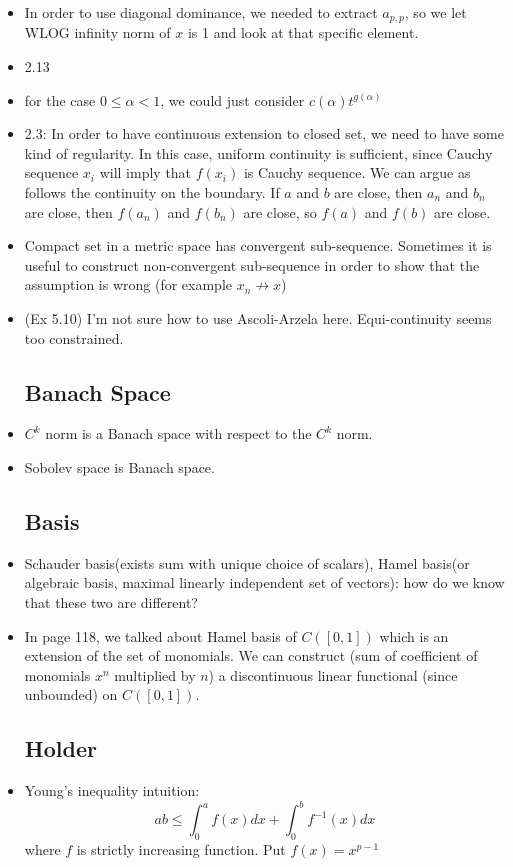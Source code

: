 \documentclass{article}
\theoremstyle{remark}
\begin{document}
\begin{itemize}
\item In order to use diagonal dominance, we needed to extract $a_{p,p}$, so we let WLOG infinity norm of $x$ is 1 and look at that specific element.

\item 2.13

\item for the case $0\leq \alpha<1$, we could just consider $c(\alpha)t^{g(\alpha)}$
\item 2.3: In order to have continuous extension to closed set, we need to have some kind of regularity. In this case, uniform continuity is sufficient, since Cauchy sequence $x_i$ will imply that $f(x_i)$ is Cauchy sequence. We can argue as follows the continuity on the boundary. If $a$ and $b$ are close, then $a_n$ and $b_n$ are close, then $f(a_n)$ and $f(b_n)$ are close, so $f(a)$ and $f(b)$ are close. 
\item Compact set in a metric space has convergent sub-sequence. Sometimes it is useful to construct non-convergent sub-sequence in order to show that the assumption is wrong (for example $x_n\not\to x$)
\item (Ex 5.10) I'm not sure how to use Ascoli-Arzela here. Equi-continuity seems too constrained.
\subsection*{Banach Space}
\item $C^k$ norm is a Banach space with respect to the $C^k$ norm.
\item Sobolev space is Banach space.
\subsection*{Basis}
\item Schauder basis(exists sum with unique choice of scalars), Hamel basis(or algebraic basis, maximal linearly independent set of vectors): how do we know that these two are different?
\item In page 118, we talked about Hamel basis of $C([0,1])$ which is an extension of the set of monomials. We can construct (sum of coefficient of monomials $x^n$ multiplied by $n$) a discontinuous linear functional (since unbounded) on $C([0,1])$.

\subsection*{Holder}
\item Young's inequality intuition: $$ab\leq\int ^a_0 f(x)dx+\int^b_0 f^{-1}(x)dx$$ where $f$ is strictly increasing function. Put $f(x)=x^{p-1}$


\end{itemize}
\end{document}
